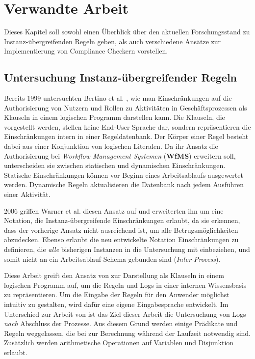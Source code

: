 
\chapter{Verwandte Arbeit} %

\label{Chapter3} %


Dieses Kapitel soll sowohl einen Überblick über den aktuellen Forschungsstand zu Instanz-übergreifenden Regeln geben, als auch verschiedene Ansätze zur Implementierung von Compliance Checkern vorstellen.

\section{Untersuchung Instanz-übergreifender Regeln}
Bereits 1999 untersuchten Bertino et al. \cite{Bertino}, wie man Einschränkungen auf die Authorisierung von Nutzern und Rollen zu Aktivitäten in Geschäftsprozessen als Klauseln in einem logischen Programm darstellen kann. Die Klauseln, die vorgestellt werden, stellen keine End-User Sprache dar, sondern repräsentieren die Einschränkungen intern in einer Regeldatenbank. Der Körper einer Regel besteht dabei aus einer Konjunktion von logischen Literalen. Da ihr Ansatz die Authorisierung bei \textit{Workflow Management Systemen} (\textbf{WfMS}) erweitern soll, unterscheiden sie zwischen statischen und dynamischen Einschränkungen. Statische Einschränkungen können vor Beginn eines Arbeitsablaufs ausgewertet werden. Dynamische Regeln aktualisieren die Datenbank nach jedem Ausführen einer Aktivität.

2006 griffen Warner et al. \cite{warner_inter_instance} diesen Ansatz auf und erweiterten ihn um eine Notation, die Instanz-übergreifende Einschränkungen erlaubt, da sie erkennen, dass der vorherige Ansatz nicht ausreichend ist, um alle Betrugsmöglichkeiten abzudecken. Ebenso erlaubt die neu entwickelte Notation Einschränkungen zu definieren, die \textit{alle} bisherigen Instanzen in die Untersuchung mit einbeziehen, und somit nicht an ein Arbeitsablauf-Schema gebunden sind (\textit{Inter-Process}).

Diese Arbeit greift den Ansatz von \cite{warner_inter_instance} zur Darstellung als Klauseln in einem logischen Programm auf, um die Regeln und Logs in einer internen Wissensbasis zu repräsentieren. Um die Eingabe der Regeln für den Anwender möglichst intuitiv zu gestalten, wird dafür eine eigene Eingabesprache entwickelt. Im Unterschied zur Arbeit von \cite{warner_inter_instance} ist das Ziel dieser Arbeit die Untersuchung von Logs \textit{nach} Abschluss der Prozesse. Aus diesem Grund werden einige Prädikate und Regeln weggelassen, die bei \cite{warner_inter_instance} zur Berechnung während der Laufzeit notwendig sind. Zusätzlich werden arithmetische Operationen auf Variablen und Disjunktion erlaubt.

